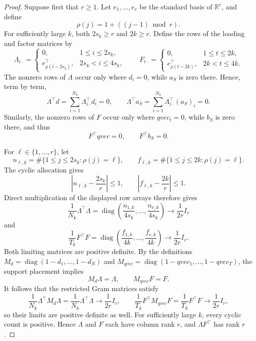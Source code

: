 \documentclass{article}
\begin{document}
\begin{proof}
Suppose first that \(r\ge1\). Let \(e_1,\ldots,e_r\) be the standard basis of \(\mathbb R^r\), and define
\[
 \rho(j)=1+((j-1)\bmod r).
\]
For sufficiently large \(k\), both \(2s_k\ge r\) and \(2k\ge r\). Define the rows of the loading and factor matrices by
\[
 \Lambda_{i\cdot}=
 \begin{cases}
  0,&1\le i\le2s_k,\\
  e_{\rho(i-2s_k)}^{\top},&2s_k<i\le4s_k,
 \end{cases}
 \qquad
 F_{t\cdot}=
 \begin{cases}
  0,&1\le t\le2k,\\
  e_{\rho(t-2k)}^{\top},&2k<t\le4k.
 \end{cases}
\]
The nonzero rows of \(\Lambda\) occur only where \(d_i=0\), while \(a_S\) is zero there. Hence, term by term,
\[
 \Lambda^{\top}d
 =\sum_{i=1}^{N_k}\Lambda_{i\cdot}^{\top}d_i=0,
 \qquad
 \Lambda^{\top}a_S
 =\sum_{i=1}^{N_k}\Lambda_{i\cdot}^{\top}(a_S)_i=0.
\]
Similarly, the nonzero rows of \(F\) occur only where \(qvec_t=0\), while \(b_S\) is zero there, and thus
\[
 F^{\top}qvec=0,
 \qquad
 F^{\top}b_S=0.
\]

For \(\ell\in\{1,\ldots,r\}\), let
\[
 n_{\ell,k}=\#\{1\le j\le2s_k:\rho(j)=\ell\},
 \qquad
 f_{\ell,k}=\#\{1\le j\le2k:\rho(j)=\ell\}.
\]
The cyclic allocation gives
\[
 \left|n_{\ell,k}-\frac{2s_k}{r}\right|\le1,
 \qquad
 \left|f_{\ell,k}-\frac{2k}{r}\right|\le1.
\]
Direct multiplication of the displayed row arrays therefore gives
\[
 \frac{1}{N_k}\Lambda^{\top}\Lambda
 =\operatorname{diag}\!\left(
   \frac{n_{1,k}}{4s_k},\ldots,\frac{n_{r,k}}{4s_k}
  \right)
 \longrightarrow \frac{1}{2r}I_r
\]
and
\[
 \frac{1}{T_k}F^{\top}F
 =\operatorname{diag}\!\left(
   \frac{f_{1,k}}{4k},\ldots,\frac{f_{r,k}}{4k}
  \right)
 \longrightarrow \frac{1}{2r}I_r.
\]
Both limiting matrices are positive definite. By the definitions \(M_d=\operatorname{diag}(1-d_1,\ldots,1-d_N)\) and \(M_{qvec}=\operatorname{diag}(1-qvec_1,\ldots,1-qvec_T)\), the support placement implies
\[
 M_d\Lambda=\Lambda,
 \qquad
 M_{qvec}F=F.
\]
It follows that the restricted Gram matrices satisfy
\[
 \frac{1}{N_k}\Lambda^{\top}M_d\Lambda
 =\frac{1}{N_k}\Lambda^{\top}\Lambda
 \longrightarrow\frac{1}{2r}I_r,
 \qquad
 \frac{1}{T_k}F^{\top}M_{qvec}F
 =\frac{1}{T_k}F^{\top}F
 \longrightarrow\frac{1}{2r}I_r,
\]
so their limits are positive definite as well. For sufficiently large \(k\), every cyclic count is positive. Hence \(\Lambda\) and \(F\) each have column rank \(r\), and \(\Lambda F^{\top}\) has rank \(r\).


\end{proof}
\end{document}
